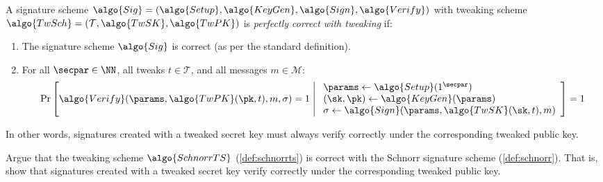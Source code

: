 \ifsolutions
\begin{mysolution}
  A signature scheme $\algo{Sig} = (\algo{Setup}, \algo{KeyGen}, \algo{Sign}, \algo{Verify})$ with tweaking scheme $\algo{TwSch} = (\mathcal{T}, \algo{TwSK}, \algo{TwPK})$ is \emph{perfectly correct with tweaking} if:
  \begin{enumerate}
    \item The signature scheme $\algo{Sig}$ is correct (as per the standard definition).
    \item For all $\secpar \in \NN$, all tweaks $t \in \mathcal{T}$, and all messages $m \in \mathcal{M}$:
    \[
      \Pr\left[\algo{Verify}(\params, \algo{TwPK}(\pk, t), m, \sigma) = 1 \;\middle|\; \begin{array}{l}
        \params \gets \algo{Setup}(1^\secpar) \\
        (\sk, \pk) \gets \algo{KeyGen}(\params) \\
        \sigma \gets \algo{Sign}(\params, \algo{TwSK}(\sk, t), m)
      \end{array}\right] = 1
    \]
  \end{enumerate}
  
  In other words, signatures created with a tweaked secret key must always verify correctly under the corresponding tweaked public key.
\end{mysolution}
\fi

\begin{exercise}[Optional]
  Argue that the tweaking scheme $\algo{SchnorrTS}$ (\autoref{def:schnorrts}) is correct with the Schnorr signature scheme (\autoref{def:schnorr}).
  That is, show that signatures created with a tweaked secret key verify correctly under the corresponding tweaked public key.
\end{exercise}

